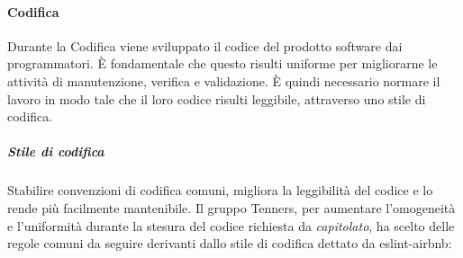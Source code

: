 \paragraph{Codifica}
Durante la Codifica viene sviluppato il codice del prodotto software dai programmatori. È fondamentale che questo risulti uniforme per migliorarne le attività di manutenzione, verifica e validazione. È quindi necessario normare il lavoro in modo tale che il loro codice risulti leggibile, attraverso uno stile di codifica.
\subparagraph*{Stile di codifica}
Stabilire convenzioni di codifica comuni, migliora la leggibilità del codice e lo rende più facilmente mantenibile. Il gruppo Tenners, per aumentare l'omogeneità e l'uniformità durante la stesura del codice richiesta da \textit{capitolato\glos}, ha scelto delle regole comuni da seguire derivanti dallo stile di codifica dettato da eslint-airbnb:
